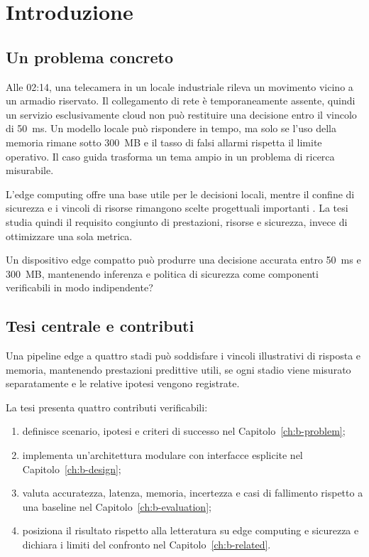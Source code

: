 \chapter{Introduzione}\label{ch:b-introduction}
\section{Un problema concreto}
Alle 02:14, una telecamera in un locale industriale rileva un movimento vicino a un armadio riservato. Il collegamento di rete è temporaneamente assente, quindi un servizio esclusivamente cloud non può restituire una decisione entro il vincolo di 50~ms. Un modello locale può rispondere in tempo, ma solo se l'uso della memoria rimane sotto 300~MB e il tasso di falsi allarmi rispetta il limite operativo. Il caso guida trasforma un tema ampio in un problema di ricerca misurabile.

L'edge computing offre una base utile per le decisioni locali, mentre il confine di sicurezza e i vincoli di risorse rimangono scelte progettuali importanti \cite{shi2016edge,roman2018mobile}. La tesi studia quindi il requisito congiunto di prestazioni, risorse e sicurezza, invece di ottimizzare una sola metrica.

\begin{researchquestion}
Un dispositivo edge compatto può produrre una decisione accurata entro 50~ms e 300~MB, mantenendo inferenza e politica di sicurezza come componenti verificabili in modo indipendente?
\end{researchquestion}

\section{Tesi centrale e contributi}
\begin{resultbox}
Una pipeline edge a quattro stadi può soddisfare i vincoli illustrativi di risposta e memoria, mantenendo prestazioni predittive utili, se ogni stadio viene misurato separatamente e le relative ipotesi vengono registrate.
\end{resultbox}

La tesi presenta quattro contributi verificabili:
\begin{enumerate}
  \item definisce scenario, ipotesi e criteri di successo nel Capitolo~\ref{ch:b-problem};
  \item implementa un'architettura modulare con interfacce esplicite nel Capitolo~\ref{ch:b-design};
  \item valuta accuratezza, latenza, memoria, incertezza e casi di fallimento rispetto a una baseline nel Capitolo~\ref{ch:b-evaluation};
  \item posiziona il risultato rispetto alla letteratura su edge computing e sicurezza e dichiara i limiti del confronto nel Capitolo~\ref{ch:b-related}.
\end{enumerate}


